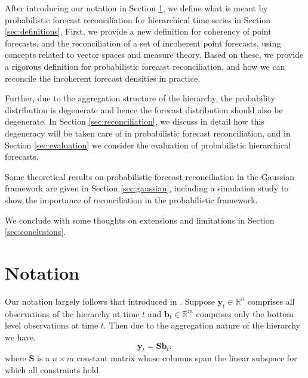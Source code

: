 \documentclass[a4paper, 11pt]{article}
\begin{document}
After introducing our notation in Section \ref{sec:notation}, we define what is meant by probabilistic forecast reconciliation for hierarchical time series in Section \ref{sec:definitions}. First, we provide a new definition for coherency of point forecasts, and the reconciliation of a set of incoherent point forecasts, using  concepts related to vector spaces and measure theory. Based on these, we provide a rigorous definition for probabilistic forecast reconciliation, and how we can reconcile the incoherent forecast densities in practice. 

Further, due to the aggregation structure of the hierarchy, the probability distribution is degenerate and hence the forecast distribution should also be degenerate. In Section \ref{sec:reconciliation}, we discuss in detail how this degeneracy will be taken care of in probabilistic forecast reconciliation, and in Section \ref{sec:evaluation} we consider the evaluation of probabilistic hierarchical forecasts. 

Some theoretical results on probabilistic forecast reconciliation in the Gaussian framework are given in Section \ref{sec:gaussian}, including a simulation study to show the importance of reconciliation in the probabilistic framework. 

We conclude with some thoughts on extensions and limitations in Section \ref{sec:conclusions}.


\section{Notation}\label{sec:notation}

Our notation largely follows that introduced in \citet{Wickramasuriya2017}. Suppose $\bm{y}_t \in \bm{\mathbb{R}}^n$ comprises all observations of the hierarchy at time $t$ and $\bm{b}_t \in \bm{\mathbb{R}}^m$ comprises only the bottom level observations at time $t$. Then due to the aggregation nature of the hierarchy we have, 
\begin{equation}
  \bm{y}_t = \bm{Sb}_t,
\end{equation}
where $\bm{S}$ is a $n \times m$ constant matrix whose columns span the linear subspace for which all constraints hold.  
\end{document}
